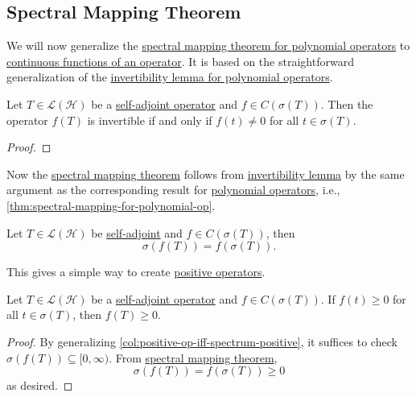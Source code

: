 \subsection{Spectral Mapping Theorem}
We will now generalize the \hyperref[thm:spectral-mapping-for-polynomial-op]{spectral mapping theorem for polynomial operators} to \hyperref[def:continuous-function-op]{continuous functions of an operator}. It is based on the straightforward generalization of the \hyperref[lma:invertibility-for-polynomial-op]{invertibility lemma for polynomial operators}.

\begin{lemma}[Invertibility]\label{lma:invertibility}
	Let \(T\in \mathcal{L} (\mathcal{H} )\) be a \hyperref[def:self-adjoint-op]{self-adjoint operator} and \(f\in C(\sigma (T))\). Then the operator \(f(T)\) is invertible if and only if \(f(t) \neq 0\) for all \(t\in \sigma (T)\).
\end{lemma}
\begin{proof}
\end{proof}

Now the \hyperref[thm:spectral-mapping]{spectral mapping theorem} follows from \hyperref[lma:invertibility]{invertibility lemma} by the same argument as the corresponding result for \hyperref[def:polynomial-op]{polynomial operators}, i.e., \autoref{thm:spectral-mapping-for-polynomial-op}.

\begin{theorem}\label{thm:spectral-mapping}
	Let \(T\in \mathcal{L} (\mathcal{H} )\) be \hyperref[def:self-adjoint-op]{self-adjoint} and \(f\in C(\sigma (T))\), then
	\[
		\sigma (f(T)) = f(\sigma (T)).
	\]
\end{theorem}

This gives a simple way to create \hyperref[def:positive-op]{positive operators}.

\begin{corollary}\label{col:positive-op-if-f-positive}
	Let \(T\in \mathcal{L} (\mathcal{H} )\) be a \hyperref[def:self-adjoint-op]{self-adjoint operator} and \(f\in C(\sigma (T))\). If \(f(t) \geq 0\) for all \(t\in \sigma (T)\), then \(f(T) \geq 0\).
\end{corollary}
\begin{proof}
	By generalizing \autoref{col:positive-op-iff-spectrum-positive}, it suffices to check \(\sigma (f(T)) \subseteq [0, \infty )\). From \hyperref[thm:spectral-mapping]{spectral mapping theorem},
	\[
		\sigma (f(T)) = f(\sigma (T)) \geq 0
	\]
	as desired.
\end{proof}

